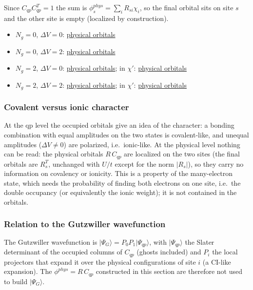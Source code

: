 \documentclass[11pt]{article}
\newcommand{\Ng}{N_{g}}
\newcommand{\dV}{\Delta V}
\begin{document}
Since $C_{qp}C_{qp}^T=1$ the sum is $\phi^{phys}_s=\sum_iR_{si}\chi_i$, so the final orbital sits on site $s$ and the other site is empty (localized by construction).
\begin{itemize}[nosep]
  \item $\Ng=0$, $\dV=0$: \href{run:../scan_ng0/dV_0.0/phys_orbitals_vs_U.mp4}{physical orbitals}
  \item $\Ng=0$, $\dV=2$: \href{run:../scan_ng0/dV_2.0/phys_orbitals_vs_U.mp4}{physical orbitals}
  \item $\Ng=2$, $\dV=0$: \href{run:../scan_ng2_not_imp/phys_orbitals_vs_U.mp4}{physical orbitals}; in $\chi'$: \href{run:../scan_ng2_not_imp/phys_orbitals_vs_U_chip.mp4}{physical orbitals}
  \item $\Ng=2$, $\dV=2$: \href{run:../scan_ng2_dV2_confirmed/phys_orbitals_vs_U.mp4}{physical orbitals}; in $\chi'$: \href{run:../scan_ng2_dV2_confirmed/phys_orbitals_vs_U_chip.mp4}{physical orbitals}
\end{itemize}

\subsubsection{Covalent versus ionic character}

At the qp level the occupied orbitals give an idea of the character: a bonding combination with equal amplitudes on the two states is covalent-like, and unequal amplitudes ($\dV\neq0$) are polarized, i.e.\ ionic-like.
At the physical level nothing can be read: the physical orbitals $R\,C_{qp}$ are localized on the two sites (the final orbitals are $R_s^T$, unchanged with $U/t$ except for the norm $|R_s|$), so they carry no information on covalency or ionicity.
This is a property of the many-electron state, which needs the probability of finding both electrons on one site, i.e.\ the double occupancy (or equivalently the ionic weight); it is not contained in the orbitals.

\subsubsection{Relation to the Gutzwiller wavefunction}

The Gutzwiller wavefunction is $|\Psi_G\rangle=P_0P_1|\Psi_{qp}\rangle$, with $|\Psi_{qp}\rangle$ the Slater determinant of the occupied columns of $C_{qp}$ (ghosts included) and $P_i$ the local projectors that expand it over the physical configurations of site $i$ (a CI-like expansion). The $\phi^{phys}=R\,C_{qp}$ constructed in this section are therefore not used to build $|\Psi_G\rangle$.
\end{document}
